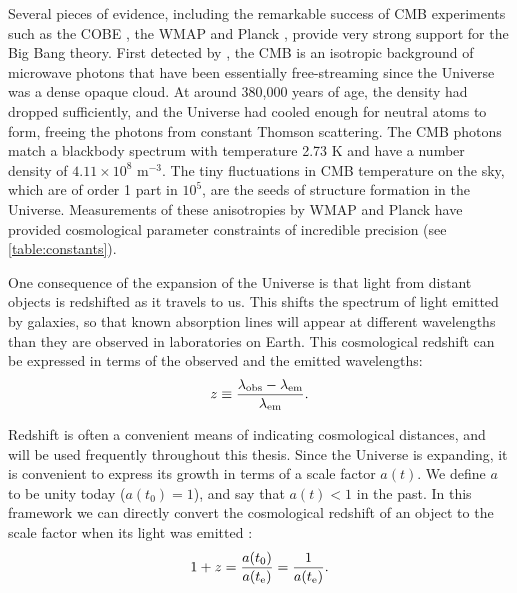 Several pieces of evidence, including the remarkable success of \acf{CMB} experiments such as the \acf{COBE} \citep{COBE96}, the \acf{WMAP} \citep{WMAP9} and \acs{Planck} \citep{PlanckXVI}, provide very strong support for the Big Bang theory. First detected by \citet{PenziasWilson65}, the \ac{CMB} is an isotropic background of microwave photons that have been essentially free-streaming since the Universe was a dense opaque cloud. At around 380,000 years of age, the density had dropped sufficiently, and the Universe had cooled enough for neutral atoms to form, freeing the photons from constant Thomson scattering. The \ac{CMB} photons match a blackbody spectrum with temperature 2.73 K and have a number density of $4.11 \times 10^8$ m$^{-3}$. The tiny fluctuations in \ac{CMB} temperature on the sky, which are of order 1 part in $10^5$, are the seeds of structure formation in the Universe. Measurements of these anisotropies by \ac{WMAP} and \acs{Planck} have provided cosmological parameter constraints of incredible precision (see \autoref{table:constants}).

One consequence of the expansion of the Universe \citep[and also the way it was first discovered,][]{Hubble29} is that light from distant objects is redshifted as it travels to us. This shifts the spectrum of light emitted by galaxies, so that known absorption lines will appear at different wavelengths than they are observed in laboratories on Earth. This cosmological redshift can be expressed in terms of the observed and the emitted wavelengths:
\begin{equation}
z \equiv \frac{\lambda_{\rm obs} - \lambda_{\rm em}}{\lambda_{\rm em}}.
\end{equation}

Redshift is often a convenient means of indicating cosmological distances, and will be used frequently throughout this thesis. Since the Universe is expanding, it is convenient to express its growth in terms of a scale factor $a(t)$. We define $a$ to be unity today ($a(t_0)=1$), and say that $a(t)<1$ in the past. In this framework we can directly convert the cosmological redshift of an object to the scale factor when its light was emitted \citep{Hogg99}:
\begin{equation}
1+z = \frac{a(t_0)}{a(t_{\rm e})} = \frac{1}{a(t_{\rm e})}.
\label{eq:z}
\end{equation}

